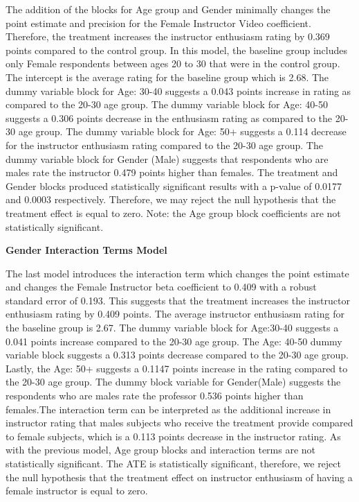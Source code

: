 \documentclass[
]{article}
\begin{document}
The addition of the blocks for Age group and Gender minimally changes
the point estimate and precision for the Female Instructor Video
coefficient. Therefore, the treatment increases the instructor
enthusiasm rating by 0.369 points compared to the control group. In this
model, the baseline group includes only Female respondents between ages
20 to 30 that were in the control group. The intercept is the average
rating for the baseline group which is 2.68. The dummy variable block
for Age: 30-40 suggests a 0.043 points increase in rating as compared to
the 20-30 age group. The dummy variable block for Age: 40-50 suggests a
0.306 points decrease in the enthusiasm rating as compared to the 20-30
age group. The dummy variable block for Age: 50+ suggests a 0.114
decrease for the instructor enthusiasm rating compared to the 20-30 age
group. The dummy variable block for Gender (Male) suggests that
respondents who are males rate the instructor 0.479 points higher than
females. The treatment and Gender blocks produced statistically
significant results with a p-value of 0.0177 and 0.0003 respectively.
Therefore, we may reject the null hypothesis that the treatment effect
is equal to zero. Note: the Age group block coefficients are not
statistically significant.

\textbf{Gender Interaction Terms Model}

The last model introduces the interaction term which changes the point
estimate and changes the Female Instructor beta coefficient to 0.409
with a robust standard error of 0.193. This suggests that the treatment
increases the instructor enthusiasm rating by 0.409 points. The average
instructor enthusiasm rating for the baseline group is 2.67. The dummy
variable block for Age:30-40 suggests a 0.041 points increase compared
to the 20-30 age group. The Age: 40-50 dummy variable block suggests a
0.313 points decrease compared to the 20-30 age group. Lastly, the Age:
50+ suggests a 0.1147 points increase in the rating compared to the
20-30 age group. The dummy block variable for Gender(Male) suggests the
respondents who are males rate the professor 0.536 points higher than
females.The interaction term can be interpreted as the additional
increase in instructor rating that males subjects who receive the
treatment provide compared to female subjects, which is a 0.113 points
decrease in the instructor rating. As with the previous model, Age group
blocks and interaction terms are not statistically significant. The ATE
is statistically significant, therefore, we reject the null hypothesis
that the treatment effect on instructor enthusiasm of having a female
instructor is equal to zero.
\end{document}
